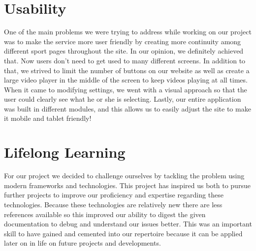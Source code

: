 \section{Usability}
\par One of the main problems we were trying to address while working on our project was to make the service more user friendly by creating more continuity among different sport pages throughout the site. In our opinion, we definitely achieved that. Now users don’t need to get used to many different screens. In addition to that, we strived to limit the number of buttons on our website as well as create a large video player in the middle of the screen to keep videos playing at all times. When it came to modifying settings, we went with a visual approach so that the user could clearly see what he or she is selecting. Lastly, our entire application was built in different modules, and this allows us to easily adjust the site to make it mobile and tablet friendly!

\section{Lifelong Learning}
\par For our project we decided to challenge ourselves by tackling the problem using modern frameworks and technologies. This project has inspired us both to pursue further projects to improve our proficiency and expertise regarding these technologies. Because these technologies are relatively new there are less references available so this improved our ability to digest the given documentation to debug and understand our issues better. This was an important skill to have gained and cemented into our repertoire because it can be applied later on in life on future projects and developments. 